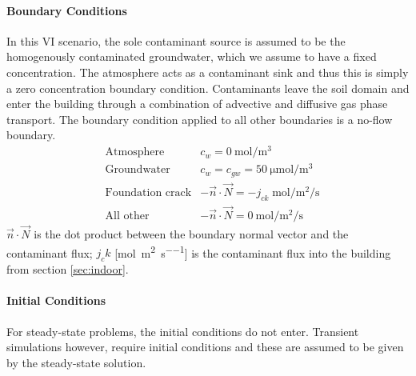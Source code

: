 \paragraph{Boundary Conditions}

In this VI scenario, the sole contaminant source is assumed to be the homogenously contaminated groundwater, which we assume to have a fixed concentration.
The atmosphere acts as a contaminant sink and thus this is simply a zero concentration boundary condition.
Contaminants leave the soil domain and enter the building through a combination of advective and diffusive gas phase transport.
The boundary condition applied to all other boundaries is a no-flow boundary.
\begin{align}
  &\text{Atmosphere} & c_w = \SI{0}{\mol\per\metre\cubed} \\
  &\text{Groundwater} & c_w = c_{gw} = \SI{50}{\micro\mol\per\metre\cubed} \\
  &\text{Foundation crack} & -\vec{n} \cdot \vec{N} = -j_{ck} \; \si{\mol\per\metre\squared\per\second}\\
  &\text{All other} & -\vec{n} \cdot \vec{N} = \SI{0}{\mol\per\metre\squared\per\second}
\end{align}
$\vec{n} \cdot \vec{N}$ is the dot product between the boundary normal vector and the contaminant flux;
$j_ck$ [\si{\mol\per\metre\squared\per\second}] is the contaminant flux into the building from section \ref{sec:indoor}.\par

\paragraph{Initial Conditions}

For steady-state problems, the initial conditions do not enter.
Transient simulations however, require initial conditions and these are assumed to be given by the steady-state solution.\par
